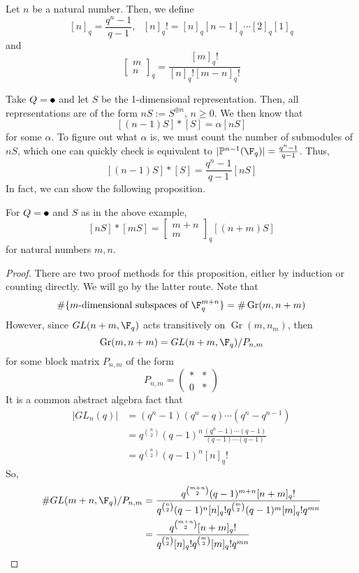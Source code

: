\documentclass[11pt,leqno,oneside]{amsbook}
\numberwithin{thm}{section}
\renewcommand{\Q}{Q} %
\newcommand{\quantumBinom}[3][q]{\left[ \begin{array}{c} #2 \\
                                          #3 \end{array} \right]_#1}
\newcommand{\Gr}{\operatorname{Gr}} %
\begin{document}
\begin{defn}
  Let \(n\) be a natural number. Then, we define \[
    [n]_q = \frac{q^n-1}{q-1}, \ \ \ [n]_q ! = [n]_q [n-1]_q \cdots
    [2]_q [1]_q
  \]
  and \[
    \quantumBinom{m}{n} = \frac{[m]_q !}{[n]_q ! [m-n]_q !}
  \]
\end{defn}
\begin{example}
  Take \(\Q = \tikz\draw[black,fill=black] (0,0) circle
  (.5ex);\) and let \(S\) be the 1-dimensional representation. Then,
  all representations are of the form \(nS := S^{\oplus n}\), \(n \geq
  0\). We then know that \[
    [(n-1)S]*[S] = \alpha [nS]
  \]
  for some \(\alpha\). To figure out what \(\alpha\) is, we must count
  the number of submodules of \(nS\), which one can quickly check is
  equivalent to \(|\mathbb{P}^{n-1}(\F_q)| =
  \frac{q^n-1}{q-1}\). Thus, \[
    [(n-1)S]*[S] = \frac{q^n-1}{q-1} [nS]
  \]
  In fact, we can show the following proposition.
\end{example}
\begin{prop}
  For \(\Q = \tikz\draw[black,fill=black] (0,0) circle
  (.5ex);\) and \(S\) as in the above example, \[
    [nS]*[mS] = \quantumBinom{m+n}{m} [(n+m)S]
  \]
  for natural numbers \(m,n\).
\end{prop}
\begin{proof}
  There are two proof methods for this proposition, either by
  induction or counting directly. We will go by the latter route. Note
  that \[
    \#\{m\text{-dimensional subspaces of } \F_q^{m+n}\} = \# \Gr(m,n+m)
  \]
  However, since \(GL(n+m,\F_q)\) acts transitively on \(\Gr(m,n_m)\),
  then \[
    \Gr(m,n+m) = GL(n+m, \F_q)/P_{n,m}
  \]
  for some block matrix \(P_{n,m}\) of the form \[
    P_{n,m} = \left(
      \begin{array}{cc}
        *&*\\
        0&*
      \end{array}
    \right)
  \]
  It is a common abstract algebra fact that
  \begin{align*}
    |GL_n(q)| & = (q^n-1)(q^n-q) \cdots (q^n-q^{n-1}) \\
    & = q^{\binom{n}{2}}(q-1)^n \frac{(q^n-1)\cdots(q-1)}{(q-1) \cdots
      (q-1)} \\
    & = q^{\binom{n}{2}}(q-1)^n [n]_q !
  \end{align*}
  So,
  \begin{align*}
    \# GL(m+n, \F_q)/P_{n,m}
    & = \frac{q^{\binom{m+n}{2}} (q-1)^{m+n}[n+m]_q !}{q^{\binom{n}{2}}
      (q-1)^n [n]_q ! q^{\binom{m}{2}} (q-1)^m [m]_q! q^{mn}} \\
    & = \frac{q^{\binom{m+n}{2}}[n+m]_q !}{q^{\binom{n}{2}}
      [n]_q ! q^{\binom{m}{2}}[m]_q! q^{mn}}
  \end{align*}
\end{proof}
\end{document}
